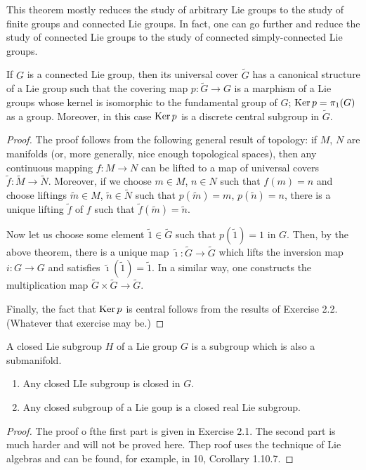 This theorem mostly reduces the study of arbitrary Lie groups to the study
of finite groups and connected Lie groups. In fact, one can go further and
reduce the study of connected Lie groups to the study of connected
simply-connected Lie groups.

\begin{theorem}
If $G$ is a connected Lie group, then its universal cover $\tilde G$ has a
canonical structure of a Lie group such that the covering map
$p\colon\tilde G\to G$ is a marphism of a Lie groups whose kernel is
isomorphic to the fundamental group of $G$; $\operatorname{Ker} p=\pi_1(G)$ as a
group. Moreover, in this case $\operatorname{Ker} p$ is a discrete central subgroup in
$\tilde G$.
\end{theorem}
\begin{proof}
The proof follows from the following general result of topology: if $M$,
$N$ are manifolds (or, more generally, nice enough topological spaces),
then any continuous mapping $f\colon M\to N$ can be lifted to a map of
universal covers $\tilde f\colon \tilde M\to\tilde N$. Moreover, if we
choose $m\in M$, $n\in N$ such that $f(m)=n$ and choose liftings $\tilde
m\in M$, $\tilde n\in\tilde N$ such that $p(\tilde m)=m$, $p(\tilde n)=n$,
there is a unique lifting $\tilde f$ of $f$ such that $\tilde f(\tilde
m)=\tilde n$.

Now let us choose some element $\tilde 1\in\tilde G$ such that $p(\tilde
1)=1$ in $G$. Then, by the above theorem, there is a unique map
$\tilde\imath\colon\tilde G\to\tilde G$ which lifts the inversion map
$i\colon G\to G$ and satisfies $\tilde\imath(\tilde 1)=\tilde 1$. In a
similar way, one constructs the multiplication map $\tilde G\times\tilde
G\to\tilde G$.

Finally, the fact that $\operatorname{Ker} p$ is central follows from the results of
Exercise 2.2. (Whatever that exercise may be.)
\end{proof}

\begin{definition}
A closed Lie subgroup $H$ of a Lie group $G$ is a subgroup which is also a
submanifold.
\end{definition}

\begin{theorem}
  \begin{enumerate}[label=\textnormal{(\arabic*)}]
  \item Any closed LIe subgroup is closed in $G$.
  \item Any closed subgroup of a Lie goup is a closed real Lie subgroup.
  \end{enumerate}
\end{theorem}
\begin{proof}
The proof o fthe first part is given in Exercise 2.1. The second part is
much harder and will not be proved here. Thep roof uses the technique of
Lie algebras and can be found, for example, in 10, Corollary 1.10.7.
\end{proof}

